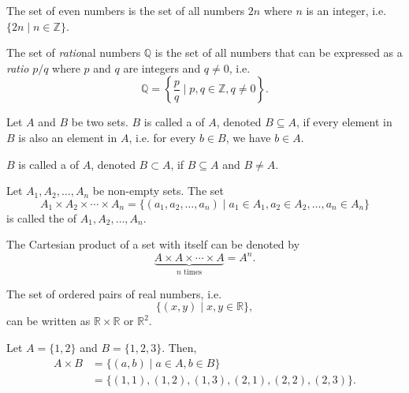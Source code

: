\begin{exmp}
The set of even numbers is the set of all numbers $ 2n $ where $ n $ is an integer, i.e. $ \{2n\mid n\in\mathbb{Z}\} $.
\end{exmp}

\begin{exmp}
The set of \emph{ratio}nal numbers $ \mathbb{Q} $ is the set of all numbers that can be expressed as a \emph{ratio} $ p/q $ where $ p $ and $ q $ are integers and $ q\neq 0 $, i.e.
\begin{equation*}
    \mathbb{Q}=\left\{\frac{p}{q}\mid p,q\in\mathbb{Z},q\neq 0\right\}.
\end{equation*}
\end{exmp}

\begin{defn}
Let $ A $ and $ B $ be two sets. $ B $ is called a  of $ A $, denoted $ B\subseteq A $, if every element in $ B $ is also an element in $ A $, i.e. for every $ b\in B $, we have $ b\in A $.

$ B $ is called a  of $ A $, denoted $ B\subset A $, if $ B\subseteq A $ and $ B\neq A $.
\end{defn}

\begin{defn}
Let $ A_1,A_2,\ldots,A_n $ be non-empty sets. The set
\begin{equation*}
    A_1\times A_2\times \cdots\times A_n=\{(a_1,a_2,\ldots,a_n)\mid a_1\in A_1,a_2\in A_2,\ldots,a_n\in A_n\}
\end{equation*}
is called the  of $ A_1,A_2,\ldots,A_n $.

The Cartesian product of a set with itself can be denoted by
\begin{equation*}
    \underbrace{A\times A\times\cdots\times A}_{n\text{ times}}=A^n.
\end{equation*}
\end{defn}

\begin{exmp}
The set of ordered pairs of real numbers, i.e.
\begin{equation*}
    \{(x,y)\mid x,y\in\mathbb{R}\},
\end{equation*}
can be written as $ \mathbb{R}\times\mathbb{R} $ or $ \mathbb{R}^2 $.
\end{exmp}

\begin{exmp}
Let $ A=\{1,2\} $ and $ B=\{1,2,3\} $. Then,
\begin{align*}
    A\times B &= \{(a,b)\mid a\in A,b\in B\} \\
    &= \{(1,1),(1,2),(1,3),(2,1),(2,2),(2,3)\}.
\end{align*}
\end{exmp}

